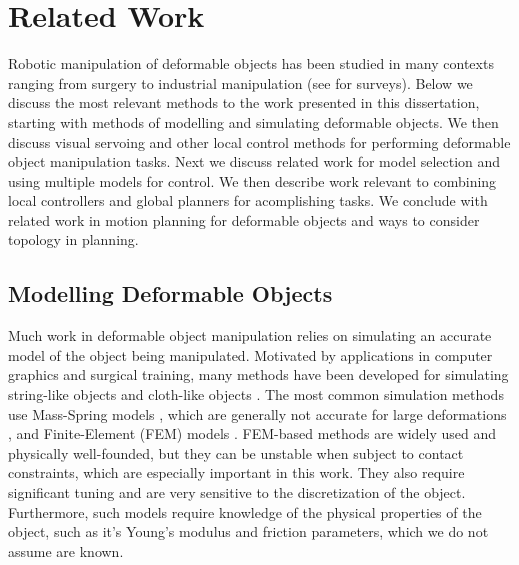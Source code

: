 \chapter{Related Work}

Robotic manipulation of deformable objects has been studied in many contexts ranging from surgery to industrial manipulation (see \cite{Khalil2010, Jimenez2012, Sanchez2018deformablesurvey} for surveys). Below we discuss the most relevant methods to the work presented in this dissertation, starting with methods of modelling and simulating deformable objects. We then discuss visual servoing and other local control methods for performing deformable object manipulation tasks. Next we discuss related work for model selection and using multiple models for control. We then describe work relevant to combining local controllers and global planners for acomplishing tasks. We conclude with related work in motion planning for deformable objects and ways to consider topology in planning.


\section{Modelling Deformable Objects}

Much work in deformable object manipulation relies on simulating an accurate model of the object being manipulated. Motivated by applications in computer graphics and surgical training, many methods have been developed for simulating string-like objects \cite{Bergou2008, Rungjiratananon2011} and cloth-like objects \cite{Baraff1998, Goldenthal2007}. The most common simulation methods use Mass-Spring models \cite{Gibson1997, Essahbi2012}, which are generally not accurate for large deformations \cite{Maris2010}, and Finite-Element (FEM) models \cite{Muller2002, Irving2004, Kaufmann2008}. FEM-based methods are widely used and physically well-founded, but they can be unstable when subject to contact constraints, which are especially important in this work. They also require significant tuning and are very sensitive to the discretization of the object. Furthermore, such models require knowledge of the physical properties of the object, such as it's Young's modulus and friction parameters, which we do not assume are known.

